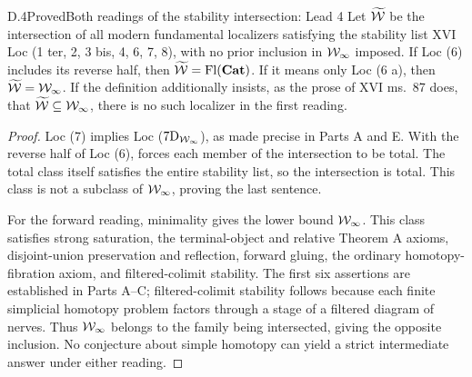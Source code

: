 \begin{claim}{D.4}{Proved}{Both readings of the stability intersection: Lead 4}
Let $\widetilde{\mathcal{W}}$ be the intersection of all modern fundamental localizers satisfying the stability list XVI Loc (1 ter, 2, 3 bis, 4, 6, 7, 8), with no prior inclusion in $\mathcal{W}_{\infty}$ imposed. If Loc (6) includes its reverse half, then $\widetilde{\mathcal{W}}=\operatorname{Fl}(\mathbf{Cat})$. If it means only Loc (6 a), then $\widetilde{\mathcal{W}}=\mathcal{W}_{\infty}$. If the definition additionally insists, as the prose of XVI ms.~87 does, that $\widetilde{\mathcal{W}}\subseteq\mathcal{W}_{\infty}$, there is no such localizer in the first reading.
\end{claim}
\begin{proof}
Loc (7) implies Loc ($7\mathrm D_{\mathcal{W}_{\infty}}$), as made precise in Parts A and E. With the reverse half of Loc (6),  forces each member of the intersection to be total. The total class itself satisfies the entire stability list, so the intersection is total. This class is not a subclass of $\mathcal{W}_{\infty}$, proving the last sentence.

For the forward reading, minimality  gives the lower bound $\mathcal{W}_{\infty}$. This class satisfies strong saturation, the terminal-object and relative Theorem A axioms, disjoint-union preservation and reflection, forward gluing, the ordinary homotopy-fibration axiom, and filtered-colimit stability. The first six assertions are established in Parts A--C; filtered-colimit stability follows because each finite simplicial homotopy problem factors through a stage of a filtered diagram of nerves. Thus $\mathcal{W}_{\infty}$ belongs to the family being intersected, giving the opposite inclusion. No conjecture about simple homotopy can yield a strict intermediate answer under either reading.
\end{proof}

